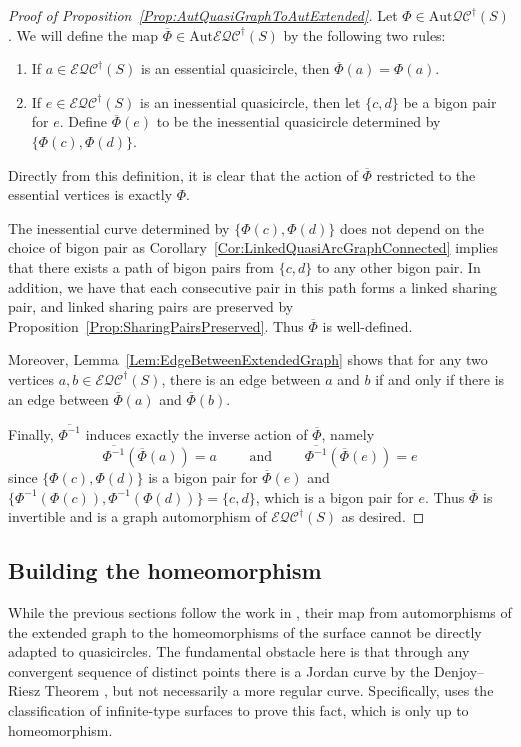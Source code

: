 \documentclass[12pt,a4paper]{amsart}
\theoremstyle{definition}
\theoremstyle{plain}
\numberwithin{equation}{section}
\newcommand{\qcg}{\mathcal{QC}^{\dagger}}
\newcommand{\eqcg}{\mathcal{E\!QC}^{\dagger}}
\newcommand{\Aut}{\mathrm{Aut}}
\begin{document}
\begin{proof}[Proof of Proposition~\ref{Prop:AutQuasiGraphToAutExtended}]
    Let $\Phi \in \Aut \qcg(S)$. We will define the map $\overline{\Phi} \in \Aut\eqcg(S)$ by the following two rules:
    \begin{enumerate}
        \item If $a \in \eqcg(S)$ is an essential quasicircle, then $\overline{\Phi}(a)=\Phi(a)$.
        \item If $e \in \eqcg(S)$ is an inessential quasicircle, then let $\{c,d\}$ be a bigon pair for $e$. Define $\overline{\Phi}(e)$ to be the inessential quasicircle determined by $\{\Phi(c),\Phi(d)\}$.
    \end{enumerate}
Directly from this definition, it is clear that the action of $\overline{\Phi}$ restricted to the essential vertices is exactly $\Phi$. 


The inessential curve determined by $\{\Phi(c),\Phi(d)\}$ does not depend on the choice of bigon pair as Corollary~\ref{Cor:LinkedQuasiArcGraphConnected} implies that there exists a path of bigon pairs from $\{c,d\}$ to any other bigon pair. In addition, we have that each consecutive pair in this path forms a linked sharing pair, and linked sharing pairs are preserved by Proposition~\ref{Prop:SharingPairsPreserved}. Thus $\overline{\Phi}$ is well-defined.

Moreover, Lemma~\ref{Lem:EdgeBetweenExtendedGraph} shows that for any two vertices $a,b \in\eqcg(S)$, there is an edge between $a$ and $b$ if and only if there is an edge between $\overline{\Phi}(a)$ and $\overline{\Phi}(b)$.

Finally, $\overline{{\Phi}^{-1}}$ induces exactly the inverse action of $\overline{\Phi}$, namely
$$\overline{\Phi^{-1}}(\overline{\Phi}(a)) = a \qquad \mbox{ and } \qquad \overline{\Phi^{-1}}(\overline{\Phi}(e)) = e$$ since $\{\Phi(c),\Phi(d)\}$ is a bigon pair for $\overline{\Phi}(e)$  and $\{\Phi^{-1}(\Phi(c)),\Phi^{-1}(\Phi(d))\} = \{c,d\}$, which is a bigon pair for $e$. Thus $\overline{\Phi}$ is invertible and is a graph automorphism of $\eqcg(S)$ as desired.
\end{proof}

\subsection{Building the homeomorphism}\label{ss-get-homeo}
While the previous sections follow the work in \cite{long2023automorphisms}, their map from automorphisms of the extended graph to the homeomorphisms of the surface cannot be directly adapted to quasicircles.
The fundamental obstacle here is that through any convergent sequence of distinct points there is a Jordan curve by the Denjoy--Riesz Theorem \cite{mooreKline1919denjoyRiesz}, but not necessarily a more regular curve.
Specifically, \cite[Lemma 4.1]{long2023automorphisms} uses the classification of infinite-type surfaces \cite[Theorem 1]{richards1963classification} to prove this fact, which is only up to homeomorphism.
\end{document}
